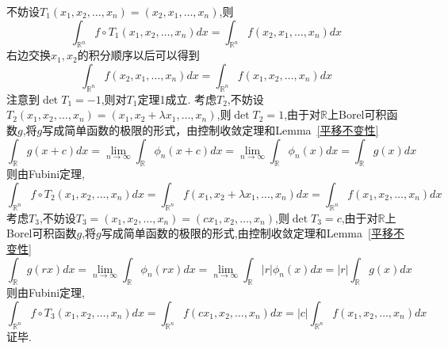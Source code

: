 \documentclass[a4paper,12pt]{ctexart}
\newcommand{\bb}[1]{\mathbb{#1}}
\begin{document}
不妨设$T_1(x_1,x_2,\dots,x_n)=(x_2,x_1,\dots,x_n)$,则
\begin{equation*}
    \int_{\mathbb{R}^n} f\circ T_1(x_1,x_2,\dots,x_n)dx= \int_{\mathbb{R}^n} f(x_2,x_1,\dots,x_n)dx
\end{equation*}
右边交换$x_1,x_2$的积分顺序以后可以得到
\begin{equation*}
   \int_{\mathbb{R}^n} f(x_2,x_1,\dots,x_n)dx=\int_{\mathbb{R}^n} f(x_1,x_2,\dots,x_n)dx
\end{equation*}
注意到$\det T_1=-1$,则对$T_1$定理1成立.
考虑$T_2$,不妨设$T_2(x_1,x_2,\dots,x_n)=(x_1,x_2+\lambda x_1,\dots,x_n)$,则$\det T_2=1$,由于对$\bb{R}$上Borel可积函数$g$,将$g$写成简单函数的极限的形式，由控制收敛定理和Lemma~\ref*{平移不变性}
\begin{equation*}
    \int_{\mathbb{R}} g(x+c)dx= \lim_{n\to\infty} \int_{\mathbb{R}}\phi_n(x+c)dx= \lim_{n\to\infty}\int_{\mathbb{R}}\phi_n(x) dx= \int_{\mathbb{R}} g(x)dx
\end{equation*}
则由Fubini定理,
\begin{equation*}
    \int_{\mathbb{R}^n} f\circ T_2(x_1,x_2,\dots,x_n)dx= \int_{\mathbb{R}^n} f(x_1,x_2+\lambda x_1,\dots,x_n)dx= \int_{\mathbb{R}^n} f(x_1,x_2,\dots,x_n)dx
\end{equation*}
考虑$T_3$,不妨设$T_3=(x_1,x_2,\dots,x_n)=(cx_1,x_2,\dots,x_n)$,则$\det T_3=c$,由于对$\bb{R}$上Borel可积函数$g$,将$g$写成简单函数的极限的形式,由控制收敛定理和Lemma~\ref*{平移不变性}
\begin{equation*}
    \int_{\mathbb{R}} g(rx)dx= \lim_{n\to\infty} \int_{\mathbb{R}}\phi_n(rx)dx= \lim_{n\to\infty}\int_{\mathbb{R}}|r|\phi_n(x) dx= |r|\int_{\mathbb{R}} g(x)dx
\end{equation*}
则由Fubini定理,
\begin{equation*}
    \int_{\mathbb{R}^n} f\circ T_3(x_1,x_2,\dots,x_n)dx= \int_{\mathbb{R}^n} f(cx_1,x_2,\dots,x_n)dx= |c|\int_{\mathbb{R}^n} f(x_1,x_2,\dots,x_n)dx
\end{equation*}
证毕.
\end{document}
